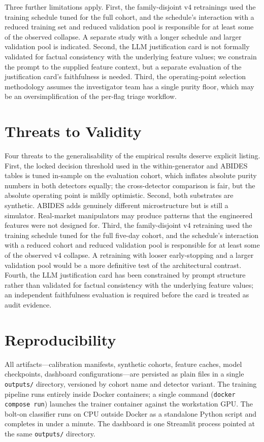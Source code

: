 \documentclass[10pt,twocolumn,letterpaper]{article}
\begin{document}
Three further limitations apply. First, the family-disjoint v4
retrainings used the training schedule tuned for the full cohort, and
the schedule's interaction with a reduced training set and reduced
validation pool is responsible for at least some of the observed
collapse. A separate study with a longer schedule and larger
validation pool is indicated. Second, the LLM justification card is
not formally validated for factual consistency with the underlying
feature values; we constrain the prompt to the supplied feature
context, but a separate evaluation of the justification card's
faithfulness is needed. Third, the operating-point selection
methodology assumes the investigator team has a single purity floor,
which may be an oversimplification of the per-flag triage workflow.


\section{Threats to Validity}
\label{sec:threats}
Four threats to the generalisability of the empirical results deserve
explicit listing. First, the locked decision threshold used in the
within-generator and ABIDES tables is tuned in-sample on the
evaluation cohort, which inflates absolute purity numbers in both
detectors equally; the cross-detector comparison is fair, but the
absolute operating point is mildly optimistic. Second, both substrates
are synthetic. ABIDES adds genuinely different microstructure but is
still a simulator. Real-market manipulators may produce patterns that
the engineered features were not designed for. Third, the
family-disjoint v4 retraining used the training schedule tuned for the
full five-day cohort, and the schedule's interaction with a reduced
cohort and reduced validation pool is responsible for at least some of
the observed v4 collapse. A retraining with looser early-stopping and a
larger validation pool would be a more definitive test of the
architectural contrast. Fourth, the LLM justification card has been
constrained by prompt structure rather than validated for factual
consistency with the underlying feature values; an independent
faithfulness evaluation is required before the card is treated as
audit evidence.

\section{Reproducibility}
\label{sec:repro}
All artifacts---calibration manifests, synthetic cohorts, feature
caches, model checkpoints, dashboard configurations---are persisted as
plain files in a single \texttt{outputs/} directory, versioned by
cohort name and detector variant. The training pipeline runs entirely
inside Docker containers; a single command (\texttt{docker compose run})
launches the trainer container against the workstation GPU. The bolt-on
classifier runs on CPU outside Docker as a standalone Python script and
completes in under a minute. The dashboard is one Streamlit process
pointed at the same \texttt{outputs/} directory.
\end{document}
